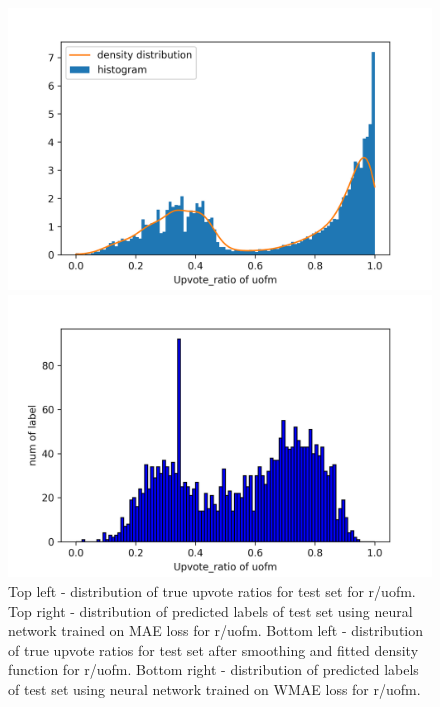 \documentclass[11pt,a4paper]{article}
\begin{document}
\begin{figure}
        \begin{minipage}{0.5\textwidth}
            \includegraphics[width=\textwidth]{uofm_task2true_smooth.png}
        \end{minipage}
        \begin{minipage}{0.5\textwidth}
            \includegraphics[width=\textwidth]{uofm_task2pred_smooth.png}
        \end{minipage}

        \caption{
            Top left - distribution of true upvote ratios for test set for r/uofm.
            Top right - distribution of predicted labels of test set using neural network trained on MAE loss for r/uofm.
            Bottom left - distribution of true upvote ratios for test set after smoothing and fitted density function for r/uofm.
            Bottom right - distribution of predicted labels of test set using neural network trained on WMAE loss for r/uofm.
        }
    \end{figure}
\end{document}
